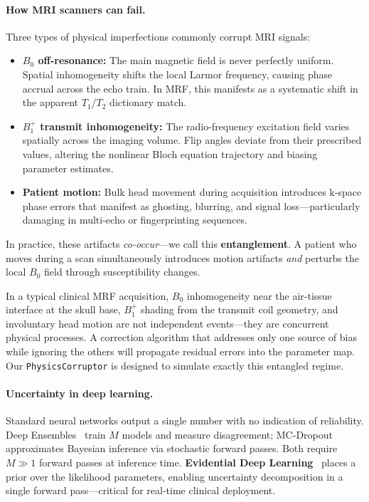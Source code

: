 \documentclass[11pt,a4paper]{article}
\begin{document}
\paragraph{How MRI scanners can fail.}
Three types of physical imperfections commonly corrupt MRI signals:
\begin{itemize}
  \item \textbf{$B_0$ off-resonance:} The main magnetic field is never perfectly uniform. Spatial inhomogeneity shifts the local Larmor frequency, causing phase accrual across the echo train. In MRF, this manifests as a systematic shift in the apparent $T_1$/$T_2$ dictionary match.
  \item \textbf{$B_1^+$ transmit inhomogeneity:} The radio-frequency excitation field varies spatially across the imaging volume. Flip angles deviate from their prescribed values, altering the nonlinear Bloch equation trajectory and biasing parameter estimates.
  \item \textbf{Patient motion:} Bulk head movement during acquisition introduces k-space phase errors that manifest as ghosting, blurring, and signal loss---particularly damaging in multi-echo or fingerprinting sequences.
\end{itemize}

In practice, these artifacts \emph{co-occur}---we call this \textbf{entanglement}. A patient who moves during a scan simultaneously introduces motion artifacts \emph{and} perturbs the local $B_0$ field through susceptibility changes.

\begin{intuition}
In a typical clinical MRF acquisition, $B_0$ inhomogeneity near the air-tissue interface at the skull base, $B_1^+$ shading from the transmit coil geometry, and involuntary head motion are not independent events---they are concurrent physical processes. A correction algorithm that addresses only one source of bias while ignoring the others will propagate residual errors into the parameter map. Our \texttt{PhysicsCorruptor} is designed to simulate exactly this entangled regime.
\end{intuition}

\paragraph{Uncertainty in deep learning.}
Standard neural networks output a single number with no indication of reliability. Deep Ensembles~\citep{lakshminarayanan2017ensembles} train $M$ models and measure disagreement; MC-Dropout~\citep{gal2016dropout} approximates Bayesian inference via stochastic forward passes. Both require $M \gg 1$ forward passes at inference time. \textbf{Evidential Deep Learning}~\citep{sensoy2018evidential,amini2020deep} places a prior over the likelihood parameters, enabling uncertainty decomposition in a single forward pass---critical for real-time clinical deployment.
\end{document}

